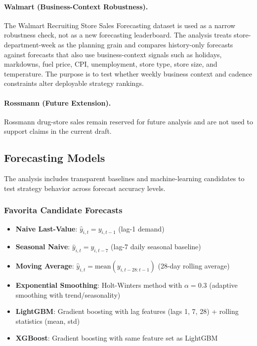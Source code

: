 \paragraph{Walmart (Business-Context Robustness).} The Walmart Recruiting Store Sales Forecasting dataset is used as a narrow robustness check, not as a new forecasting leaderboard. The analysis treats store-department-week as the planning grain and compares history-only forecasts against forecasts that also use business-context signals such as holidays, markdowns, fuel price, CPI, unemployment, store type, store size, and temperature. The purpose is to test whether weekly business context and cadence constraints alter deployable strategy rankings.

\paragraph{Rossmann (Future Extension).} Rossmann drug-store sales remain reserved for future analysis and are not used to support claims in the current draft.

\subsection{Forecasting Models}

The analysis includes transparent baselines and machine-learning candidates to test strategy behavior across forecast accuracy levels.

\subsubsection{Favorita Candidate Forecasts}

\begin{itemize}
    \item \textbf{Naive Last-Value}: $\hat{y}_{i,t} = y_{i,t-1}$ (lag-1 demand)
    \item \textbf{Seasonal Naive}: $\hat{y}_{i,t} = y_{i,t-7}$ (lag-7 daily seasonal baseline)
    \item \textbf{Moving Average}: $\hat{y}_{i,t} = \text{mean}(y_{i,t-28:t-1})$ (28-day rolling average)
    \item \textbf{Exponential Smoothing}: Holt-Winters method with $\alpha=0.3$ (adaptive smoothing with trend/seasonality)
    \item \textbf{LightGBM}: Gradient boosting with lag features (lags 1, 7, 28) + rolling statistics (mean, std)
    \item \textbf{XGBoost}: Gradient boosting with same feature set as LightGBM
\end{itemize}

